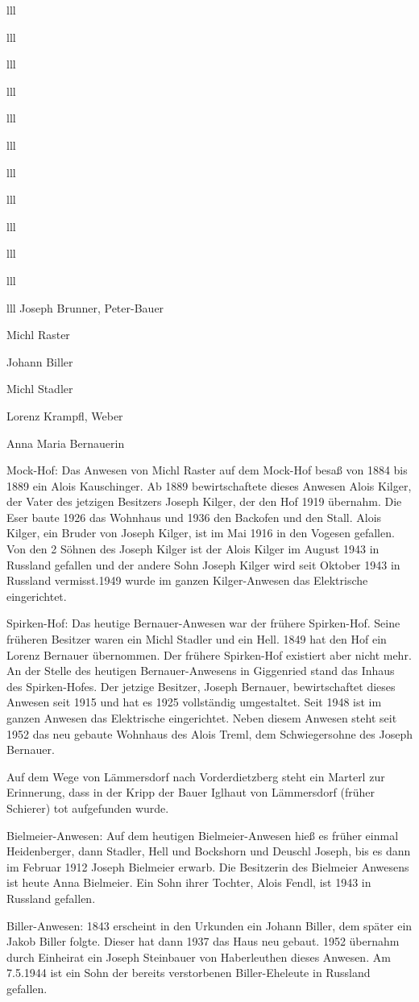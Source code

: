 \documentclass[12pt,a4pager]{book}
\begin{document}
\begin{tabuluar}{lll}
\begin{tabuluar}{lll}
\begin{tabuluar}{lll}
\begin{tabuluar}{lll}
\begin{tabuluar}{lll}
\begin{tabuluar}{lll}
\begin{tabuluar}{lll}
\begin{tabuluar}{lll}
\begin{tabuluar}{lll}
\begin{tabuluar}{lll}
\begin{tabuluar}{lll}
\begin{tabuluar}{lll}
Joseph Brunner, Peter-Bauer

Michl Raster

Johann Biller

Michl Stadler

Lorenz Krampfl, Weber

Anna Maria Bernauerin

Mock-Hof: Das Anwesen von Michl Raster auf dem Mock-Hof besaß von 1884 bis 1889
ein Alois Kauschinger. Ab 1889 bewirtschaftete dieses Anwesen Alois Kilger, der
Vater des jetzigen Besitzers Joseph Kilger, der den Hof 1919 übernahm. Die Eser
baute 1926 das Wohnhaus und 1936 den Backofen und den Stall. Alois Kilger, ein
Bruder von Joseph Kilger, ist im Mai 1916 in den Vogesen gefallen. Von den 2
Söhnen des Joseph Kilger ist der Alois Kilger im August 1943 in Russland
gefallen und der andere Sohn Joseph Kilger wird seit Oktober 1943 in Russland
vermisst.1949 wurde im ganzen Kilger-Anwesen das Elektrische eingerichtet.

Spirken-Hof: Das heutige Bernauer-Anwesen war der frühere Spirken-Hof. Seine
früheren Besitzer waren ein Michl Stadler und ein Hell. 1849 hat den Hof ein
Lorenz Bernauer übernommen. Der frühere Spirken-Hof existiert aber nicht mehr.
An der Stelle des heutigen Bernauer-Anwesens in Giggenried stand das Inhaus des
Spirken-Hofes. Der jetzige Besitzer, Joseph Bernauer, bewirtschaftet dieses
Anwesen seit 1915 und hat es 1925 vollständig umgestaltet. Seit 1948 ist im
ganzen Anwesen das Elektrische eingerichtet. Neben diesem Anwesen steht seit
1952 das neu gebaute Wohnhaus des Alois Treml, dem Schwiegersohne des Joseph
Bernauer.

Auf dem Wege von Lämmersdorf nach Vorderdietzberg steht ein Marterl zur
Erinnerung, dass in der Kripp der Bauer Iglhaut von Lämmersdorf (früher
Schierer) tot aufgefunden wurde.

Bielmeier-Anwesen: Auf dem heutigen Bielmeier-Anwesen hieß es früher einmal
Heidenberger, dann Stadler, Hell und Bockshorn und Deuschl Joseph, bis es dann
im Februar 1912 Joseph Bielmeier erwarb. Die Besitzerin des Bielmeier Anwesens
ist heute Anna Bielmeier. Ein Sohn ihrer Tochter, Alois Fendl, ist 1943 in
Russland gefallen.

Biller-Anwesen: 1843 erscheint in den Urkunden ein Johann Biller, dem später ein
Jakob Biller folgte. Dieser hat dann 1937 das Haus neu gebaut. 1952 übernahm
durch Einheirat ein Joseph Steinbauer von Haberleuthen dieses Anwesen. Am
7.5.1944 ist ein Sohn der bereits verstorbenen Biller-Eheleute in Russland
gefallen.


\end{tabuluar}
\end{tabuluar}
\end{tabuluar}
\end{tabuluar}
\end{tabuluar}
\end{tabuluar}
\end{tabuluar}
\end{tabuluar}
\end{tabuluar}
\end{tabuluar}
\end{tabuluar}
\end{tabuluar}
\end{document}
